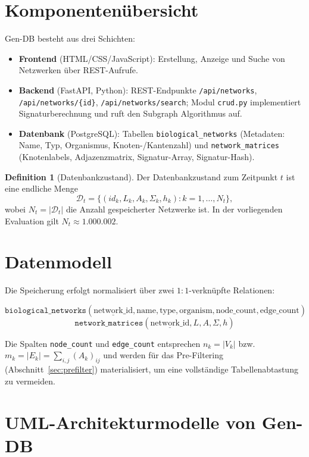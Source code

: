 \documentclass[a4paper,12pt, twoside]{report}
\theoremstyle{definition}
\newtheorem{definition}{Definition}
\begin{document}
\section{Komponentenübersicht}

Gen-DB besteht aus drei Schichten:

\begin{itemize}
	\item \textbf{Frontend} (HTML/CSS/JavaScript): Erstellung, Anzeige und Suche von Netzwerken über REST-Aufrufe.
	\item \textbf{Backend} (FastAPI, Python): REST-Endpunkte \texttt{/api/networks}, \texttt{/api/networks/\{id\}}, \texttt{/api/networks/search}; Modul \texttt{crud.py} implementiert Signaturberechnung und ruft den Subgraph Algorithmus auf.
	\item \textbf{Datenbank} (PostgreSQL): Tabellen \texttt{biological\_networks} (Metadaten: Name, Typ, Organismus, Knoten-/Kantenzahl) und \texttt{network\_matrices} (Knotenlabels, Adjazenzmatrix, Signatur-Array, Signatur-Hash).
\end{itemize}

\begin{definition}[Datenbankzustand]
	Der Datenbankzustand zum Zeitpunkt $t$ ist eine endliche Menge
	\[
	\mathcal{D}_t = \{(id_k, L_k, A_k, \Sigma_k, h_k) : k = 1,\ldots,N_t\},
	\]
	wobei $N_t = |\mathcal{D}_t|$ die Anzahl gespeicherter Netzwerke ist. In der vorliegenden Evaluation gilt $N_t \approx 1.000.002$.
\end{definition}

\section{Datenmodell}

Die Speicherung erfolgt normalisiert über zwei $1{:}1$-verknüpfte Relationen:

\[
\texttt{biological\_networks}(\underline{\text{network\_id}}, \text{name}, \text{type}, \text{organism}, \text{node\_count}, \text{edge\_count})
\]
\[
\texttt{network\_matrices}(\underline{\text{network\_id}}, L, A, \Sigma, h)
\]

Die Spalten \texttt{node\_count} und \texttt{edge\_count} entsprechen $n_k = |V_k|$ bzw. $m_k = |E_k| = \sum_{i,j} (A_k)_{ij}$ und werden für das Pre-Filtering (Abschnitt~\ref{sec:prefilter}) materialisiert, um eine vollständige Tabellenabtastung zu vermeiden.

\section{UML-Architekturmodelle von Gen-DB}
\label{sec:uml}
\end{document}
